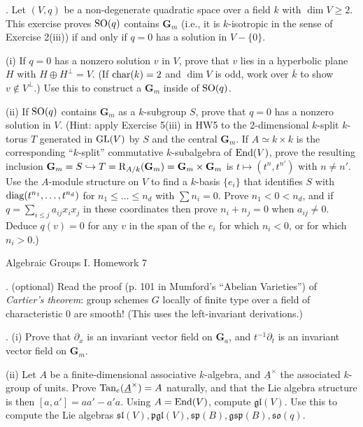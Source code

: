 \documentclass[10pt]{amsart}
\begin{document}
\medskip{}. Let $(V,q)$ be a non-degenerate quadratic space over a field $k$ with $\dim V \ge 2$. This exercise proves 
${\rm{SO}}(q)$ contains ${\mathbf{G}}_m$ (i.e., it is $k$-isotropic in the sense of Exercise 2(iii)) if and only if $q = 0$ has a solution in $V - \{0\}$. 

(i) If $q = 0$ has a nonzero solution $v$ in $V$, prove that $v$ lies in a hyperbolic plane $H$ with $H \oplus H^{\perp} = V$.
(If ${\rm{char}}(k) = 2$ and $\dim V$ is odd, work over $\overline{k}$ to show $v \not\in V^{\perp}$.)  
Use this to construct a $\mathbf{G}_m$ inside of ${\rm{SO}}(q)$.

(ii) If ${\rm{SO}}(q)$ contains ${\mathbf{G}}_m$ as a $k$-subgroup $S$, prove that $q = 0$ has a nonzero solution in $V$.
(Hint: apply Exercise 5(iii) in HW5 to the 2-dimensional $k$-split $k$-torus $T$ generated in ${\rm{GL}}(V)$ by $S$ 
and the central ${\mathbf{G}}_m$.  If $A \simeq k \times k$ is the corresponding ``$k$-split'' commutative $k$-subalgebra of
${\rm{End}}(V)$, prove the resulting inclusion $\mathbf{G}_m = S \hookrightarrow T = {\rm{R}}_{A/k}(\mathbf{G}_m) = 
\mathbf{G}_m \times \mathbf{G}_m$ is $t \mapsto (t^n, t^{n'})$ with $n \ne n'$.  Use the $A$-module structure on $V$
to find a $k$-basis $\{e_i\}$ that identifies $S$ with ${\rm{diag}}(t^{n_1}, \dots, t^{n_d})$ for $n_1 \le \dots \le n_d$ with $\sum n_i = 0$.
Prove $n_1 < 0 < n_d$, and if 
$q = \sum_{i \le j} a_{ij} x_i x_j$ in these coordinates then prove $n_i + n_j = 0$ when $a_{ij} \ne 0$.
Deduce $q(v) = 0$ for any $v$ in the span of the $e_i$ for which $n_i < 0$, or for which $n_i > 0$.) 

\newpage

\centerline{\sc Algebraic Groups I. Homework 7}

. (optional)  Read the 
proof (p. 101 in Mumford's ``Abelian Varieties'') of 
{\em Cartier's theorem}:  group schemes $G$ locally of finite type over a field of characteristic 0 are smooth!
(This uses the left-invariant derivations.)

\medskip{}. (i) Prove that $\partial_x$ is an invariant vector field on ${\mathbf{G}}_a$,
and $t^{-1} \partial_t$ is an invariant vector field on $\mathbf{G}_m$.

(ii) Let $A$ be a finite-dimensional associative $k$-algebra,
and $\underline{A}^{\times}$ the associated $k$-group of units. 
Prove ${\rm{Tan}}_e(\underline{A}^{\times}) = A$ naturally, and 
that the Lie algebra structure is then $[a,a'] = aa' - a'a$.  Using 
$A = {\rm{End}}(V)$, compute $\mathfrak{gl}(V)$.  Use this to compute the Lie algebras
$\mathfrak{sl}(V), \mathfrak{pgl}(V), \mathfrak{sp}(B), \mathfrak{gsp}(B), \mathfrak{so}(q)$.
\end{document}
